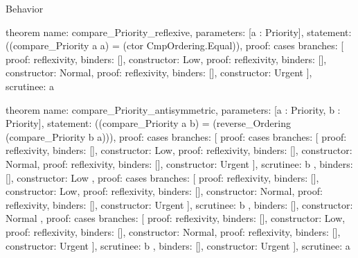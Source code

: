 \begin{lexlean}{Behavior}
\begin{semanticmodule}
theorem{
  name: compare_Priority_reflexive,
  parameters: [a : Priority],
  statement: ((compare_Priority a a) = (ctor CmpOrdering.Equal)),
  proof: cases{
    branches: [
      {proof: reflexivity{}, binders: [], constructor: Low},
      {proof: reflexivity{}, binders: [], constructor: Normal},
      {proof: reflexivity{}, binders: [], constructor: Urgent}
    ],
    scrutinee: a
  }
}

theorem{
  name: compare_Priority_antisymmetric,
  parameters: [a : Priority, b : Priority],
  statement: ((compare_Priority a b) = (reverse_Ordering (compare_Priority b a))),
  proof: cases{
    branches: [
      {
        proof: cases{
          branches: [
            {proof: reflexivity{}, binders: [], constructor: Low},
            {proof: reflexivity{}, binders: [], constructor: Normal},
            {proof: reflexivity{}, binders: [], constructor: Urgent}
          ],
          scrutinee: b
        },
        binders: [],
        constructor: Low
      },
      {
        proof: cases{
          branches: [
            {proof: reflexivity{}, binders: [], constructor: Low},
            {proof: reflexivity{}, binders: [], constructor: Normal},
            {proof: reflexivity{}, binders: [], constructor: Urgent}
          ],
          scrutinee: b
        },
        binders: [],
        constructor: Normal
      },
      {
        proof: cases{
          branches: [
            {proof: reflexivity{}, binders: [], constructor: Low},
            {proof: reflexivity{}, binders: [], constructor: Normal},
            {proof: reflexivity{}, binders: [], constructor: Urgent}
          ],
          scrutinee: b
        },
        binders: [],
        constructor: Urgent
      }
    ],
    scrutinee: a
  }
}


\end{semanticmodule}
\end{lexlean}
